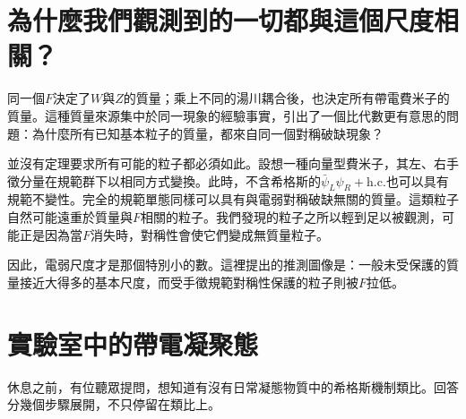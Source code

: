 \section{為什麼我們觀測到的一切都與這個尺度相關？}

同一個\(F\)決定了\(W\)與\(Z\)的質量；乘上不同的湯川耦合後，也決定所有帶電費米子的質量。這種質量來源集中於同一現象的經驗事實，引出了一個比代數更有意思的問題：為什麼所有已知基本粒子的質量，都來自同一個對稱破缺現象？

並沒有定理要求所有可能的粒子都必須如此。設想一種向量型費米子，其左、右手徵分量在規範群下以相同方式變換。此時，不含希格斯的\(\bar\psi_L\psi_R+\mathrm{h.c.}\)也可以具有規範不變性。完全的規範單態同樣可以具有與電弱對稱破缺無關的質量。這類粒子自然可能遠重於質量與\(F\)相關的粒子。我們發現的粒子之所以輕到足以被觀測，可能正是因為當\(F\)消失時，對稱性會使它們變成無質量粒子。

因此，電弱尺度才是那個特別小的數。這裡提出的推測圖像是：一般未受保護的質量接近大得多的基本尺度，而受手徵規範對稱性保護的粒子則被\(F\)拉低。

\begin{classroomqa}
\end{classroomqa}

\begin{classroomqa}
\end{classroomqa}

\section{實驗室中的帶電凝聚態}

休息之前，有位聽眾提問，想知道有沒有日常凝態物質中的希格斯機制類比。回答分幾個步驟展開，不只停留在類比上。

\begin{classroomqa}
\end{classroomqa}

